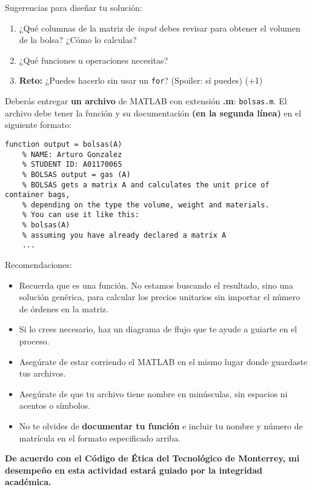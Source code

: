 \documentclass[]{book}
\newcommand{\matlab}[1]{\lstinline[style=Matlab-pyglike]!#1!}
\theoremstyle{definition}
\begin{document}
\bigskip

Sugerencias para diseñar tu solución:
\begin{enumerate}[label=\alph*)]
    \item ¿Qué columnas de la matriz de \textit{input} debes revisar para obtener el volumen de la bolsa? ¿Cómo lo calculas?
    \item ¿Qué funciones u operaciones necesitas?
    \item \textbf{Reto:} ¿Puedes hacerlo sin usar un \matlab{for}? (Spoiler: sí puedes) (+1)
\end{enumerate}

\pagebreak

Deberás entregar \textbf{un archivo} de MATLAB con extensión \textbf{.m}: \texttt{bolsas.m}.
El archivo debe tener la función y su documentación \textbf{(en la segunda línea)} en el siguiente formato:

\bigskip

\begin{lstlisting}[style=Matlab-editor]
    function output = bolsas(A)
    % NAME: Arturo Gonzalez
    % STUDENT ID: A01170065
    % BOLSAS output = gas (A)
    % BOLSAS gets a matrix A and calculates the unit price of container bags,
    % depending on the type the volume, weight and materials.
    % You can use it like this:
    % bolsas(A)
    % assuming you have already declared a matrix A
    ...
\end{lstlisting}

\bigskip

{\Large Recomendaciones:}

\begin{itemize}
    \item Recuerda que es una función. No estamos buscando el resultado, sino una solución genérica, para calcular los precios unitarios sin importar el número de órdenes en la matriz.
    \item Si lo crees necesario, haz un diagrama de flujo que te ayude a guiarte en el proceso.
    \item Asegúrate de estar corriendo el MATLAB en el mismo lugar donde guardaste tus archivos.
    \item Asegúrate de que tu archivo tiene nombre en minúsculas, sin espacios ni acentos o símbolos. 
    \item No te olvides de \textbf{documentar tu función} e incluir tu nombre y número de matrícula en el formato especificado arriba.
\end{itemize}

\vfill

\textbf{De acuerdo con el Código de Ética del Tecnológico de Monterrey, mi desempeño en esta actividad estará guiado por la integridad académica.}
\end{document}
